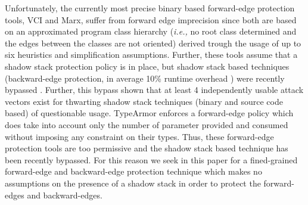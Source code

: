 
Unfortunately, the currently most precise binary based forward-edge protection tools, VCI and Marx, suffer from forward edge imprecision
since both are based on an approximated program class hierarchy  
(\textit{i.e.,} no root class determined and the edges between the classes are not oriented) derived trough the usage of up to six heuristics and simplification assumptions. Further, these tools assume
that a shadow stack protection policy is in place, but shadow stack based techniques (backward-edge protection, in average 10\% runtime overhead \cite{shadowstack:overhead})
were recently bypassed \cite{safestack:bypass}. Further, this bypass shown that at least 4 independently usable attack vectors exist for thwarting shadow stack techniques 
(binary and source code based) of questionable usage.
TypeArmor enforces a forward-edge policy which does take into account only the number of parameter 
provided and consumed without imposing any constraint on their types. 
Thus, these forward-edge protection tools are too permissive and the shadow stack based technique has been recently bypassed.
For this reason we seek in this paper for a fined-grained forward-edge and backward-edge protection technique which makes no 
assumptions on the presence of a shadow stack in order to protect the forward-edges and backward-edges.

